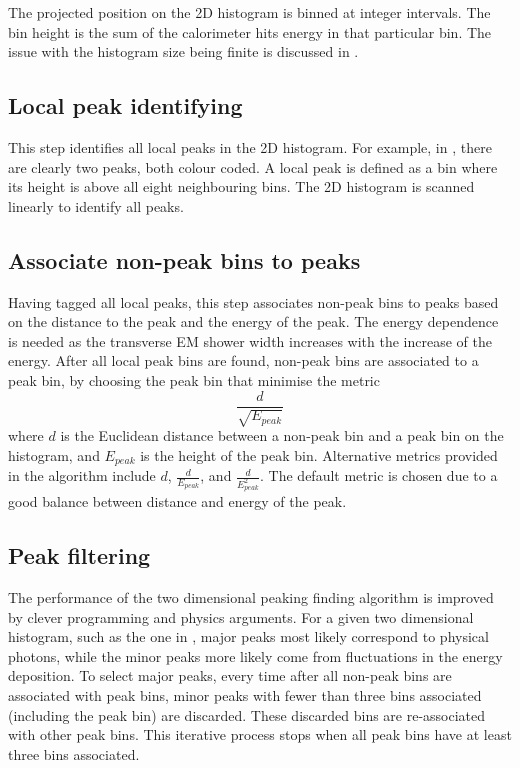 The projected position on the 2D histogram is binned at integer intervals. The bin height is the sum of the calorimeter hits energy in that particular bin. The issue with the histogram size being finite is discussed in .

\subsection{Local peak identifying}

This step identifies all local peaks in the 2D histogram. For example, in , there are clearly two peaks, both colour coded. A local peak is defined as a bin where its height is above all eight neighbouring bins. The 2D histogram is scanned linearly to identify all peaks. %

\subsection{Associate non-peak bins to peaks}

Having tagged all local peaks, this step associates non-peak bins to peaks based on the distance to the peak and the energy of the peak. The energy dependence is needed as the transverse EM shower width increases with the increase of the energy. After all local peak bins are found, non-peak bins are associated to a peak bin, by choosing the peak bin that minimise the metric
\begin{equation}
\frac{d}{\sqrt{E_{peak}}}
\end{equation}
where $d$ is the Euclidean distance between a non-peak bin and a peak bin on the histogram, and $E_{peak}$ is the height of the peak bin. Alternative metrics provided in the algorithm include $d$, $\frac{d}{{E_{peak}}}$, and $\frac{d}{{E_{peak}^2}}$. The default metric is chosen due to a good balance between distance and energy of the peak.


\subsection{Peak filtering}

The performance of the two dimensional peaking finding algorithm is improved by clever programming and physics arguments. For a given two dimensional histogram, such as the one in , major peaks most likely correspond to physical photons, while the minor peaks more likely come from fluctuations in the energy deposition. To select major peaks, every time after all non-peak bins are associated with peak bins, minor peaks with fewer than three bins associated (including the peak bin) are discarded. These discarded bins are re-associated with other peak bins. This iterative process stops when all peak bins have at least three bins associated.


